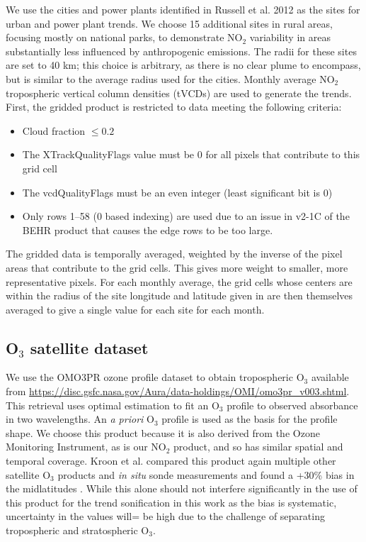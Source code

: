 \documentclass[a4paper,10pt,oneside]{article}
\newcommand{\ce}[1]{$\mathrm{#1}$}
\begin{document}
\begin{sloppy}
	We use the cities and power plants identified in Russell et al. 2012 \cite{russell12} as the sites for urban and power plant trends. We choose 15 additional sites in rural areas, focusing mostly on national parks, to demonstrate \ce{NO_2} variability in areas substantially less influenced by anthropogenic emissions. The radii for these sites are set to 40 km; this choice is arbitrary, as there is no clear plume to encompass, but is similar to the average radius used for the cities. Monthly average \ce{NO_2} tropospheric vertical column densities (tVCDs) are used to generate the trends. First, the gridded product is restricted to data meeting the following criteria:
	
	\begin{itemize}
	\item Cloud fraction $\leq 0.2$
	\item The XTrackQualityFlags value must be 0 for all pixels that contribute to this grid cell
	\item The vcdQualityFlags must be an even integer (least significant bit is 0)
	\item Only rows 1--58 (0 based indexing) are used due to an issue in v2-1C of the BEHR product that causes the edge rows to be too large.
	\end{itemize}
	
	The gridded data is temporally averaged, weighted by the inverse of the pixel areas that contribute to the grid cells. This gives more weight to smaller, more representative pixels.  For each monthly average, the grid cells whose centers are within the radius of the site longitude and latitude given in \cite{russell12} are then themselves averaged to give a single value for each site for each month.

\subsection{O$_3$ satellite dataset}

	We use the OMO3PR ozone profile dataset to obtain tropospheric \ce{O_3} available from \url{https://disc.gsfc.nasa.gov/Aura/data-holdings/OMI/omo3pr_v003.shtml}.   This retrieval uses optimal estimation to fit an \ce{O_3} profile to observed absorbance in two wavelengths. An \emph{a priori} \ce{O_3} profile is used as the basis for the profile shape.  We choose this product because it is also derived from the Ozone Monitoring Instrument, as is our \ce{NO_2} product, and so has similar spatial and temporal coverage. Kroon et al. compared this product again multiple other satellite \ce{O_3} products and \emph{in situ} sonde measurements and found a +30\% bias in the midlatitudes  \cite{kroon11}. While this alone should not interfere significantly in the use of this product for the trend sonification in this work as the bias is systematic, uncertainty in the values will= be high due to the challenge of separating tropospheric and stratospheric \ce{O_3}.
	

\end{sloppy}
\end{document}
